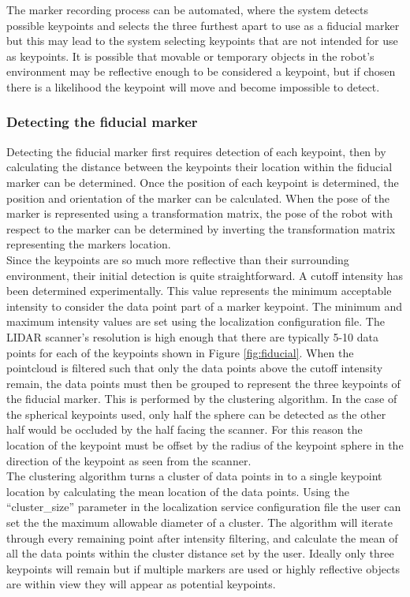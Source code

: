 The marker recording process can be automated, where the system detects possible keypoints and selects the three furthest apart to use as a fiducial marker but this may lead to the system selecting keypoints that are not intended for use as keypoints. It is possible that movable or temporary objects in the robot's environment may be reflective enough to be considered a keypoint, but if chosen there is a likelihood the keypoint will move and become impossible to detect.\\

\subsubsection{Detecting the fiducial marker}

Detecting the fiducial marker first requires detection of each keypoint, then by calculating the distance between the keypoints their location within the fiducial marker can be determined. Once the position of each keypoint is determined, the position and orientation of the marker can be calculated. When the pose of the marker is represented using a transformation matrix, the pose of the robot with respect to the marker can be determined by inverting the transformation matrix representing the markers location.\\

Since the keypoints are so much more reflective than their surrounding environment, their initial detection is quite straightforward. A cutoff intensity has been determined experimentally. This value represents the minimum acceptable intensity to consider the data point part of a marker keypoint. The minimum and maximum intensity values are set using the localization configuration file. The LIDAR scanner's resolution is high enough that there are typically 5-10 data points for each of the keypoints shown in Figure \ref{fig:fiducial}. When the pointcloud is filtered such that only the data points above the cutoff intensity remain, the data points must then be grouped to represent the three keypoints of the fiducial marker. This is performed by the clustering algorithm. In the case of the spherical keypoints used, only half the sphere can be detected as the other half would be occluded by the half facing the scanner. For this reason the location of the keypoint must be offset by the radius of the keypoint sphere in the direction of the keypoint as seen from the scanner.\\

The clustering algorithm turns a cluster of data points in to a single keypoint location by calculating the mean location of the data points. Using the ``cluster\_size'' parameter in the localization service configuration file the user can set the the maximum allowable diameter of a cluster. The algorithm will iterate through every remaining point after intensity filtering, and calculate the mean of all the data points within the cluster distance set by the user. Ideally only three keypoints will remain but if multiple markers are used or highly reflective objects are within view they will appear as potential keypoints.\\

